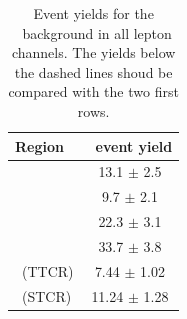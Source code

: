 	
	\begin{table}[htbp]
		\begin{center}
						\caption{Event yields for the \ttbar\ background in all lepton channels. The yields below the dashed lines shoud be compared with the two first rows. }
			
			\begin{tabular} {l c}
				\toprule
				Region & \ttbar\ event yield  \\ 
				\midrule 
				\STSR & 13.1 $\pm $ 2.5 \\
				\TTSR & 9.7 $\pm $ 2.1 \\
				\TTCR & 22.3 $\pm $ 3.1 \\
				\STCR & 33.7 $\pm $ 3.8 \B\\
				\hdashline
				\TTSR\ (TTCR) & 7.44 $\pm $ 1.02 \T \\
				\STSR\ (STCR)& 11.24 $\pm $ 1.28 \\  				 
				\bottomrule
			\end{tabular}
		\end{center}
	\end{table}
\clearpage
